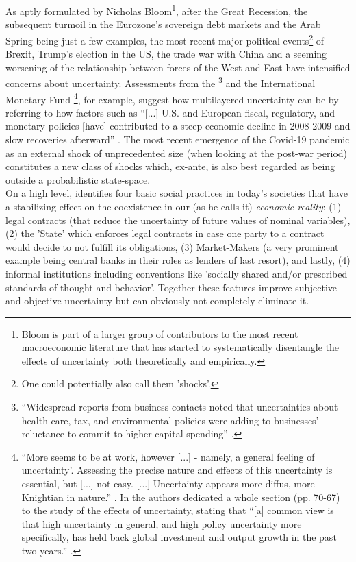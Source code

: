\documentclass[a4paper,11pt,listof=nochaptergap,oneside,pointednumbers,bibtotoc,bigheadings,liststotoc,hidelinks]{scrbook}
\theoremstyle{mysatz}
\theoremstyle{mydefinition}
\theoremstyle{mytheorem}
\theoremstyle{mybemerkung}
\begin{document}
\href{https://site.stanford.edu/2018/session-6}{As aptly formulated by Nicholas Bloom}\footnote{Bloom is part of a larger group of contributors to the most recent macroeconomic literature that has started to systematically disentangle the effects of uncertainty both theoretically and empirically.}, after the Great Recession, the subsequent turmoil in the Eurozone's sovereign debt markets and the Arab Spring being just a few examples, the most recent major political events\footnote{One could potentially also call them 'shocks'.} of Brexit, Trump's election in the US,  the trade war with China and a seeming worsening of the relationship between forces of the West and East have intensified concerns about uncertainty. Assessments from the 
\citet{FOMC:09}\footnote{``Widespread reports from business contacts noted that uncertainties about health-care, tax, and environmental policies were adding to businesses' reluctance to commit to higher capital spending'' \citep{FOMC:09}.} and the International Monetary Fund \citep{IMF:12, IMF:13}\footnote{``More seems to be at work, however [...] - namely, a general feeling of uncertainty'. Assessing the precise nature and effects of this uncertainty is essential, but [...] not easy. [...] Uncertainty appears more diffus, more Knightian in nature.'' \citep{IMF:12}. In \citet{IMF:13} the authors dedicated a whole section (pp. 70-67) to the study of the effects of uncertainty, stating that ``[a] common view is that high uncertainty in general, and high policy uncertainty more specifically, has held back global investment and output growth in the past two years.'' \citep[p. 70]{IMF:13}.}, for example, suggest how multilayered uncertainty can be by referring to how factors such as ``[...] U.S. and European fiscal, regulatory, and monetary policies [have] contributed to a steep economic decline in 2008-2009 and slow recoveries afterward'' \citep[p.1594]{bakeretal:15}. The most recent emergence of the Covid-19 pandemic as an external shock of unprecedented size (when looking at the post-war period) constitutes a new class of shocks which, ex-ante, is also best regarded as being outside a probabilistic state-space. \\

On a high level, \citet{dequesh:00} identifies four basic social practices in today's societies that have a stabilizing effect on the coexistence in our (as  he calls it) \textit{economic reality}: (1) legal contracts (that reduce the uncertainty of future values of nominal variables), (2) the 'State' which enforces legal contracts in case one party to a contract would decide to not fulfill its obligations, (3) Market-Makers (a very prominent example being central banks in their roles as lenders of last resort), and lastly, (4) informal institutions including conventions like 'socially shared and/or prescribed standards of thought and behavior'.  Together these features improve subjective and objective uncertainty but can obviously not completely eliminate it.
\end{document}
